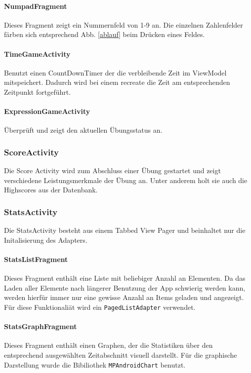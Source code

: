 \paragraph{NumpadFragment}
Dieses Fragment zeigt ein Nummernfeld von 1-9 an. Die einzelnen Zahlenfelder
färben sich entsprechend Abb. \ref{ablauf} beim Drücken eines Feldes.

\paragraph{TimeGameActivity}
Benutzt einen CountDownTimer der die verbleibende Zeit im ViewModel mitspeichert.
Dadurch wird bei einem recreate die Zeit am entsprechenden Zeitpunkt fortgeführt.

\paragraph{ExpressionGameActivity}
Überprüft und zeigt den aktuellen Übungsstatus an.

\subsubsection{ScoreActivity}
Die Score Activity wird zum Abschluss einer Übung gestartet und zeigt
verschiedene Leistungsmerkmale der Übung an. Unter anderem holt sie auch
die Highscores aus der Datenbank.

\subsubsection{StatsActivity}
Die StatsActivity besteht aus einem Tabbed View Pager und beinhaltet nur die
Initalisierung des Adapters.

\paragraph{StatsListFragment}
Dieses Fragment enthält eine Liste mit beliebiger Anzahl an Elementen. Da das
Laden aller Elemente nach längerer Benutzung der App schwierig werden kann,
werden hierfür immer nur eine gewisse Anzahl an Items geladen und angezeigt.
Für diese Funktionaliät wird ein \texttt{PagedListAdapter} verwendet.

\paragraph{StatsGraphFragment}
Dieses Fragment enthält einen Graphen, der die Statistiken
über den entsprechend ausgewählten Zeitabschnitt visuell darstellt. Für die graphische
Darstellung wurde die Bibiliothek \texttt{MPAndroidChart} benutzt.

